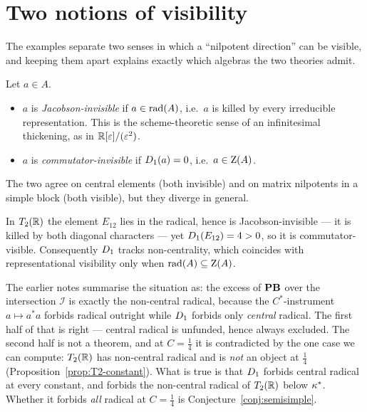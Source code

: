 \section{Two notions of visibility}
\label{sec:visibility}

The examples separate two senses in which a ``nilpotent direction'' can be
visible, and keeping them apart explains exactly which algebras the two theories
admit.

\begin{definition}\label{def:visibility}
Let $a\in A$.
\begin{itemize}
\item $a$ is \emph{Jacobson-invisible} if $a\in\operatorname{rad}(A)$, i.e.\ $a$ is killed by
  every irreducible representation.  This is the scheme-theoretic sense of an
  infinitesimal thickening, as in $\mathbb{R}[\varepsilon]/(\varepsilon^2)$.
\item $a$ is \emph{commutator-invisible} if $D_1(a)=0$, i.e.\
  $a\in\operatorname{Z}(A)$.
\end{itemize}
\end{definition}

The two agree on central elements (both invisible) and on matrix nilpotents in a
simple block (both visible), but they diverge in general.

\begin{proposition}\label{prop:visibility-T2}
In $T_2(\mathbb{R})$ the element $E_{12}$ lies in the radical, hence is
Jacobson-invisible --- it is killed by both diagonal characters --- yet
$D_1(E_{12})=4>0$, so it is commutator-visible.  Consequently
$D_1$ tracks non-centrality, which coincides with representational
visibility only when $\operatorname{rad}(A)\subseteq\operatorname{Z}(A)$.
\end{proposition}

\begin{remark}\label{rem:excess}
The earlier notes summarise the situation as: the excess of $\mathbf{PB}$ over the
intersection $\mathcal{I}$ is exactly the non-central radical, because the
$C^*$-instrument $a\mapsto a^*a$ forbids radical outright while $D_1$
forbids only \emph{central} radical.  The first half of that is right --- central
radical is unfunded, hence always excluded.  The second half is not a theorem,
and at $C=\tfrac14$ it is contradicted by the one case we can compute:
$T_2(\mathbb{R})$ has non-central radical and is \emph{not} an object at $\tfrac14$
(Proposition~\ref{prop:T2-constant}).  What is true is that $D_1$ forbids
central radical at every constant, and forbids the non-central radical of
$T_2(\mathbb{R})$ below $\kappa^*$.  Whether it forbids \emph{all} radical at
$C=\tfrac14$ is Conjecture~\ref{conj:semisimple}.
\end{remark}

